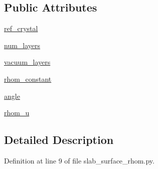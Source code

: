 \subsection*{Public Attributes}
\begin{DoxyCompactItemize}
\item 
\hyperlink{class_d_f_t___k_i_t_1_1apps_1_1slab__surface__rhom_1_1_rhom__trigonal__surface_ac8b802d45e21f6b25c3830f69d586af0}{ref\+\_\+crystal}
\item 
\hyperlink{class_d_f_t___k_i_t_1_1apps_1_1slab__surface__rhom_1_1_rhom__trigonal__surface_a3dfbfe8019a222c410f028cda617c09c}{num\+\_\+layers}
\item 
\hyperlink{class_d_f_t___k_i_t_1_1apps_1_1slab__surface__rhom_1_1_rhom__trigonal__surface_ab595b72d6f93bce6ce61d31610cc882e}{vacuum\+\_\+layers}
\item 
\hyperlink{class_d_f_t___k_i_t_1_1apps_1_1slab__surface__rhom_1_1_rhom__trigonal__surface_ad09e487f3439b81b81e1b04b2aece740}{rhom\+\_\+constant}
\item 
\hyperlink{class_d_f_t___k_i_t_1_1apps_1_1slab__surface__rhom_1_1_rhom__trigonal__surface_adb18e885bfdfd9e77a3ae7cb783b405f}{angle}
\item 
\hyperlink{class_d_f_t___k_i_t_1_1apps_1_1slab__surface__rhom_1_1_rhom__trigonal__surface_ace9262e8227a0f6d26b7c9f422bd78a7}{rhom\+\_\+u}
\end{DoxyCompactItemize}


\subsection{Detailed Description}


Definition at line 9 of file slab\+\_\+surface\+\_\+rhom.\+py.



